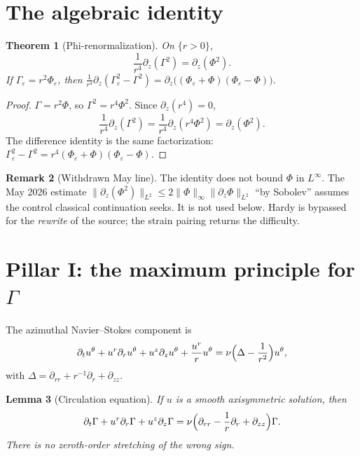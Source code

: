 \documentclass[11pt]{article}
\newtheorem{theorem}{Theorem}[section]
\newtheorem{lemma}[theorem]{Lemma}
\theoremstyle{definition}
\newtheorem{remark}[theorem]{Remark}
\newcommand{\eps}{\varepsilon}
\newcommand{\ur}{u^{r}}
\newcommand{\uz}{u^{z}}
\newcommand{\ut}{u^{\theta}}
\newcommand{\Ph}{\Phi}
\newcommand{\Ga}{\Gamma}
\newcommand{\Lint}{L^{\infty}}
\newcommand{\norm}[2]{\|#1\|_{#2}}
\begin{document}
\section{The algebraic identity}

\begin{theorem}[Phi-renormalization]
\label{thm:identity}
On \(\{r>0\}\),
\begin{equation}
  \label{eq:id}
  \frac1{r^4}\partial_z(\Ga^2)=\partial_z(\Ph^2).
\end{equation}
If \(\Ga_\eps=r^2\Ph_\eps\), then
\(\frac1{r^4}\partial_z(\Ga_\eps^2-\Ga^2)
=\partial_z\bigl((\Ph_\eps+\Ph)(\Ph_\eps-\Ph)\bigr)\).
\end{theorem}

\begin{proof}
\(\Ga=r^2\Ph\), so \(\Ga^2=r^4\Ph^2\). Since \(\partial_z(r^4)=0\),
\[
  \frac1{r^4}\partial_z(\Ga^2)
  =\frac1{r^4}\partial_z(r^4\Ph^2)
  =\partial_z(\Ph^2).
\]
The difference identity is the same factorization:
\(\Ga_\eps^2-\Ga^2=r^4(\Ph_\eps+\Ph)(\Ph_\eps-\Ph)\).
\end{proof}

\begin{remark}[Withdrawn May line]
\label{rem:withdrawn}
The identity does not bound \(\Ph\) in \(\Lint\).
The May 2026 estimate
\(\norm{\partial_z(\Ph^2)}{L^2}\le 2\norm{\Ph}{\infty}\norm{\partial_z\Ph}{L^2}\)
``by Sobolev'' assumes the control classical continuation seeks.
It is not used below. Hardy is bypassed for the \emph{rewrite} of the
source; the strain pairing returns the difficulty.
\end{remark}

\section{Pillar I: the maximum principle for \(\Gamma\)}

The azimuthal Navier--Stokes component is
\begin{equation}
  \label{eq:utheta}
  \partial_t\ut+\ur\partial_r\ut+\uz\partial_z\ut+\frac{\ur}{r}\ut
  =\nu\Bigl(\Delta-\frac1{r^2}\Bigr)\ut,
\end{equation}
with \(\Delta=\partial_{rr}+r^{-1}\partial_r+\partial_{zz}\).

\begin{lemma}[Circulation equation]
\label{lem:Gamma-eq}
If \(u\) is a smooth axisymmetric solution, then
\begin{equation}
  \label{eq:Gamma}
  \partial_t\Ga+\ur\partial_r\Ga+\uz\partial_z\Ga
  =\nu\Bigl(\partial_{rr}-\frac1r\partial_r+\partial_{zz}\Bigr)\Ga.
\end{equation}
There is no zeroth-order stretching of the wrong sign.
\end{lemma}
\end{document}
